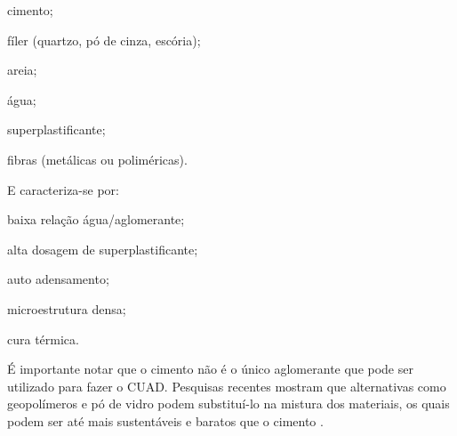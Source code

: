 \begin{alineas}[label=\textbullet]
  \item cimento;
  \item fíler (quartzo, pó de cinza, escória);
  \item areia;
  \item água;
  \item superplastificante;
  \item fibras (metálicas ou poliméricas).
\end{alineas}

E caracteriza-se por:

\begin{alineas}[label=\textbullet]
  \item baixa relação água/aglomerante;
  \item alta dosagem de superplastificante;
  \item auto adensamento;
  \item microestrutura densa;%
  \item cura térmica.
\end{alineas}

É importante notar que o cimento não é o único aglomerante que pode ser utilizado para fazer o CUAD. Pesquisas recentes mostram que alternativas como geopolímeros e pó de vidro podem substituí-lo na mistura dos materiais, os quais podem ser até mais sustentáveis e baratos que o cimento \cite{Goldoni} \cite{Soliman}.


%

